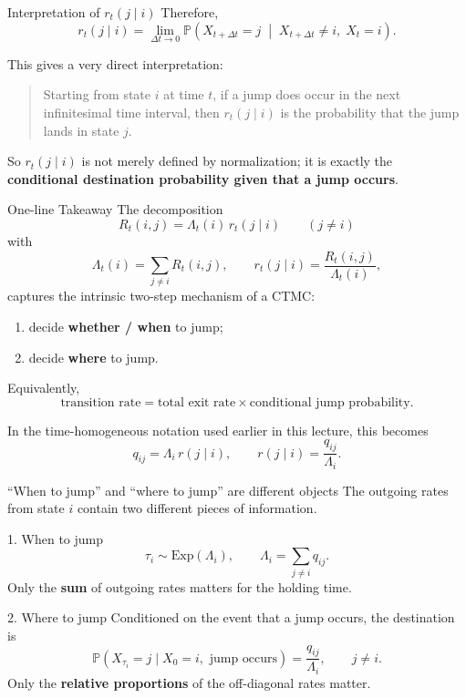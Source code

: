 \documentclass[aspectratio=169,professionalfonts]{beamer}
\newcommand{\Prob}{\mathbb{P}}
\begin{document}
\begin{frame}{Interpretation of $r_t(j\mid i)$}
\small
Therefore,
\[
r_t(j\mid i)
=
\lim_{\Delta t\to 0}
\Prob\!\left(
X_{t+\Delta t}=j
\;\middle|\;
X_{t+\Delta t}\neq i,\;X_t=i
\right).
\]

This gives a very direct interpretation:

\medskip
\begin{quote}
Starting from state $i$ at time $t$, if a jump does occur in the next infinitesimal time interval, then $r_t(j\mid i)$ is the probability that the jump lands in state $j$.
\end{quote}

\medskip
So $r_t(j\mid i)$ is not merely defined by normalization; it is exactly the \textbf{conditional destination probability given that a jump occurs}.

\end{frame}

\begin{frame}{One-line Takeaway}
\small
The decomposition
\[
\boxed{
R_t(i,j)=\Lambda_t(i)\,r_t(j\mid i)
}
\qquad (j\neq i)
\]
with
\[
\Lambda_t(i)=\sum_{j\neq i}R_t(i,j),
\qquad
r_t(j\mid i)=\frac{R_t(i,j)}{\Lambda_t(i)},
\]
captures the intrinsic two-step mechanism of a CTMC:

\begin{enumerate}
    \item decide \textbf{whether / when} to jump;
    \item decide \textbf{where} to jump.
\end{enumerate}

Equivalently,
\[
\text{transition rate}
=
\text{total exit rate}
\times
\text{conditional jump probability}.
\]

\medskip
In the time-homogeneous notation used earlier in this lecture, this becomes
\[
q_{ij}=\Lambda_i\,r(j\mid i),
\qquad
r(j\mid i)=\frac{q_{ij}}{\Lambda_i}.
\]

\end{frame}

\begin{frame}{``When to jump'' and ``where to jump'' are different objects}
\small
The outgoing rates from state $i$ contain two different pieces of information.

\begin{block}{1. When to jump}
\[
\tau_i\sim \mathrm{Exp}(\Lambda_i),
\qquad
\Lambda_i=\sum_{j\neq i}q_{ij}.
\]
Only the \textbf{sum} of outgoing rates matters for the holding time.
\end{block}

\begin{alertblock}{2. Where to jump}
Conditioned on the event that a jump occurs, the destination is
\[
\Prob(X_{\tau_i}=j\mid X_0=i,\text{ jump occurs})
=\frac{q_{ij}}{\Lambda_i},\qquad j\neq i.
\]
Only the \textbf{relative proportions} of the off-diagonal rates matter.
\end{alertblock}
\end{frame}
\end{document}
